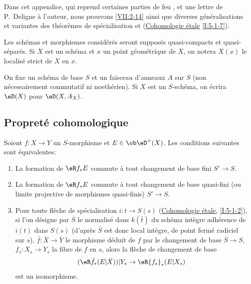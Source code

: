 Dans cet appendice, qui reprend certaines parties de feu \cite[II]{sga5}, et 
une lettre de P.\ Deligne à l'auteur, nous prouvons \ref{VII:2-14} ainsi que 
diverses généralisations et variantes des théorèmes de spécialisation 
\cite[XVI 2.1]{sga4} et (\hyperref[I]{Cohomologie étale} \ref{I:5-1-7}). 

Les schémas et morphismes considérés seront supposés quasi-compacts et 
quasi-séparés. Si $X$ est un schéma et $x$ un point géométrique de 
$X$, on notera $X(x)$ le localisé strict de $X$ en $x$. 

On fixe un schéma de base $S$ et un faisceau d'anneaux $A$ sur $S$ (non 
nécessairement commutatif ni noethérien). Si $X$ est un $S$-schéma, on 
écrira $\eD(X)$ pour $\eD(X,A_X)$. 





\subsection{Propreté cohomologique}\label{VII:5-1}





\begin{proposition}\label{VII:5-1-1}
Soient $f:X\to Y$ un $S$-morphisme et $E\in\ob \eD^+(X)$. Les conditions 
suivantes sont équivalentes: 
\begin{enumerate}[\indent (i)]
  \item La formation de $\eR f_\ast E$ commute à tout changement de base 
    fini $S'\to S$.
  \item La formation de $\eR f_\ast E$ commute à tout changement de base 
    quasi-fini (ou limite projective de morphismes quasi-finis) $S'\to S$. 
  \item Pour toute flèche de spécialisation $i:t\to S(s)$ 
    (\hyperref[I]{Cohomologie étale}, \ref{I:5-1-2}), si l'on désigne par 
    $\bar S$ le normalisé dans $k(\bar t)$ du schéma intègre 
    adhérence de $i(t)$ dans $S(s)$ (d'après 
    \cite[IV, 6.15.5, 18.5.11, 18.8.16]{ega} $\bar S$ est donc local 
    intègre, de point fermé radiciel sur $s$), $\bar f:\bar X\to \bar Y$ 
    le morphisme déduit de $f$ par le changement de base $\bar S\to S$, 
    $f_s:X_s\to Y_s$ la fibre de $f$ en $s$, alors la flèche de changement 
    de base 
    \[
      (\eR \bar f_\ast (E|\bar X))|Y_s \to \eR {f_s}_\ast(E|X_s) 
    \]
    est un isomorphisme. 
\end{enumerate}
\end{proposition}

